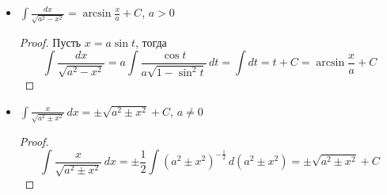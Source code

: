 \begin{itemize}
\begin{proof}
\begin{enumerate}
		\item Пусть $a > 0$, $x = k\tg t$.
		\begin{equation*}
		\int \frac{dx}{\sqrt{x^2 + k^2}} =
		\int \frac{dt}{\cos^2 t \cdot \sqrt{\tg^2 t + 1}} =
		\int \frac{dt}{\cos t} =
		\int \frac{d(\sin t)}{1 - \sin^2 t} =
		-\frac12 \ln \left| \frac{\sin t - 1}{\sin t + 1} \right| + C_1 =
		\end{equation*}
		\begin{equation*}
		= -\frac12 \ln \left| \frac{\sin^2 t - 1}{\sin^2 t + 1 + 2\sin t} \right| + C_1 =
		\end{equation*}
		\begin{equation*}
		\left| x = k\tg t \Rightarrow
		\sqrt{\frac1{\cos^2 t} - 1} = \frac{x}k \Rightarrow
		\cos^2 t = \frac{k^2}{x^2 + k^2} \Leftrightarrow
		\sin^2 t = \frac{x^2}{x^2 + k^2} \right|
		\end{equation*}
		\begin{equation*}
		= -\frac12 \ln \left| \frac{-\frac{k^2}{x^2 + k^2}}{\frac{2x^2 + k^2}{x^2 + k^2} + 2\sqrt{\frac{x^2}{x^2 + k^2}}} \right| + C_1 =
		\frac12 \ln \frac1{k^2} \left| 2x^2 + k^2 + 2x\sqrt{x^2 + k^2} \right| + C_1 =
		\end{equation*}
		\begin{equation*}
		= \frac12 \ln \left| x^2 + 2x\sqrt{x^2 + a} + (x^2 + a) \right| + C =
		\ln \left| x + \sqrt{x^2 + a} \right| + C
		\end{equation*}
	\end{enumerate}
	\end{proof}
	
	\item $\displaystyle \int \frac{dx}{\sqrt{a^2 - x^2}} = \arcsin \frac{x}a + C$, $a > 0$
	\begin{proof}
	Пусть $x = a \sin t$, тогда
	\begin{equation*}
	\int \frac{dx}{\sqrt{a^2 - x^2}} =
	a \int \frac{\cos t}{a \sqrt{1 - \sin^2 t}}\,dt =
	\int dt =
	t + C =
	\arcsin \frac{x}a + C
	\end{equation*}
	\end{proof}
	
	\item $\displaystyle \int \frac{x}{\sqrt{a^2 \pm x^2}}\,dx = \pm \sqrt{a^2 \pm x^2} + C$, $a \neq 0$
	\begin{proof}
	\begin{equation*}
	\int \frac{x}{\sqrt{a^2 \pm x^2}}\,dx =
	\pm \frac12 \int (a^2 \pm x^2)^{-\tfrac12}\,d(a^2 \pm x^2) =
	\pm \sqrt{a^2 \pm x^2} + C
	\end{equation*}
	\end{proof}
	

\end{itemize}
